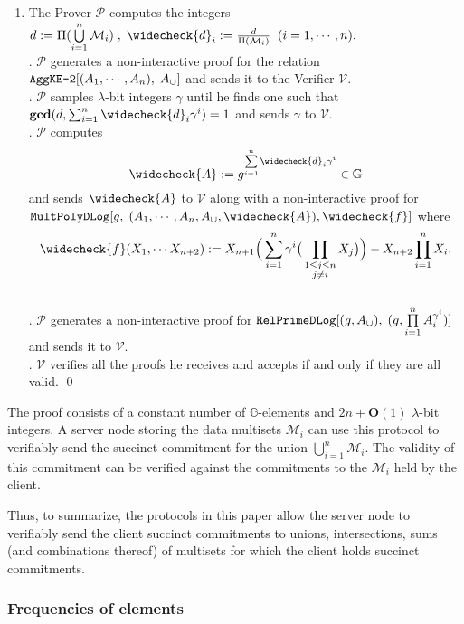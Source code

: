 \documentclass[11pt, lettersize, notitlepage, leqno, footskip=0.6cm]{article}
\newcommand{\pl}{\prod\limits}
\newcommand{\slim}{\sum\limits}
\newcommand{\ttt}{\texttt}
\newcommand{\bG}{\mathbb{G}}
\newcommand{\mc}{\mathcal}
\newcommand{\mbf}{\mathbf}
\newcommand{\lam}{\lambda}
\newcommand{\weck}{\widecheck}
\newcommand{\bO}{\mbf{O}}
\newcommand{\mP}{\mc{P}}
\newcommand{\V}{\mc{V}}
\newcommand{\mcM}{\mc{M}}
\newcommand{\vs}{\vspace{-0.15cm}}
\newcommand{\noin}{\noindent}
\newcommand{\GCD}{\mbf{gcd}}
\numberwithin{equation}{section}
\begin{document}
\begin{enumerate}[wide, labelwidth=!, labelindent=0pt]\vs \item The Prover $\mP$ computes the integers $d:= \Pi(\bigcup\limits_{i=1}^n \mc{M}_i)\;,\;\weck{d}_i:= \frac{d}{\Pi(\mcM_i)}\;\;(i=1,\cdots,n).$\\
\noin 2. $\mP$ generates a non-interactive proof for the relation $\ttt{AggKE-2}[(A_1,\cdots,A_n),\;A_{\tt{\cup}}]$ and sends it to the Verifier $\V$.\\
\noin 3. $\mP$ samples $\lam$-bit integers $\gamma$ until he finds one such that $ \GCD(d, \sum_{i=1}^n \weck{d}_i\gamma^i) =1$ and sends $\gamma$ to $\V$.\\
\noin 4. $\mP$ computes \vs $$\weck{A}:= g^{\slim_{i=1}^n \weck{d}_i\gamma^i}\in\bG\vs $$ and sends $\weck{A}$ to $\V$ along with a non-interactive proof for $\ttt{MultPolyDLog}[g,\;(A_1,\cdots, A_n, A_{\tt{\cup}}, \weck{A}), \weck{f}]$ where \vs $$\weck{f}(X_1,\cdots X_{n+2}):= X_{n+1}\Big(\slim_{i=1}^n \gamma^i\big(\pl_{\substack{1\leq j\leq n\\ j\neq i}} X_j\big)\Big) - X_{n+2}\pl_{i=1}^n X_i.$$\\
\noin 5. $\mP$ generates a non-interactive proof for $\ttt{RelPrimeDLog}[(g, A_{\tt{\cup}}),\;(g, \pl_{i=1}^n A_i^{\gamma^i})]$ and sends it to $\V$.\\
\noin 6. $\V$ verifies all the proofs he receives and accepts if and only if they are all valid. \qed \end{enumerate}

\noin The proof consists of a constant number of $\bG$-elements and $2n+\bO(1)$ $\lam$-bit integers. A server node storing the data multisets $\mcM_i$ can use this protocol to verifiably send the succinct commitment for the union $\bigcup_{i=1}^n \mcM_i$. The validity of this commitment can be verified against the commitments to the $\mcM_i$ held by the client.

\vspace{0.2cm}

Thus, to summarize, the protocols in this paper allow the server node to verifiably send the client succinct commitments to unions, intersections, sums (and combinations thereof) of multisets for which the client holds succinct commitments.  

\subsubsection{\fontsize{11}{11} \selectfont Frequencies of elements}
\end{document}
